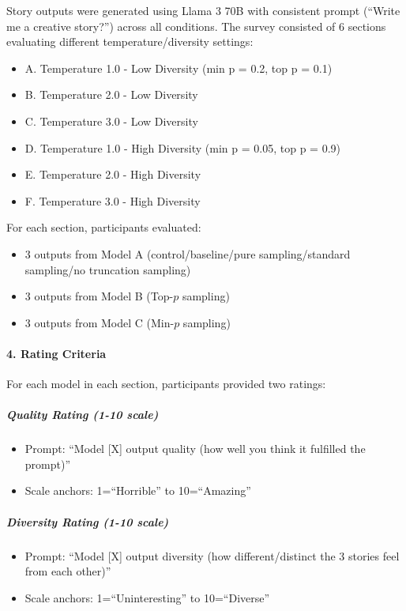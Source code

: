 \documentclass{article}
\begin{document}
Story outputs were generated using Llama 3 70B with consistent prompt (``Write me a creative story?'') across all conditions. The survey consisted of 6 sections evaluating different temperature/diversity settings:
\begin{itemize}
    \item A. Temperature 1.0 - Low Diversity (min p = 0.2, top p = 0.1)
    \item B. Temperature 2.0 - Low Diversity
    \item C. Temperature 3.0 - Low Diversity
    \item D. Temperature 1.0 - High Diversity (min p = 0.05, top p = 0.9)
    \item E. Temperature 2.0 - High Diversity
    \item F. Temperature 3.0 - High Diversity
\end{itemize}

For each section, participants evaluated:
\begin{itemize}
    \item 3 outputs from Model A (control/baseline/pure sampling/standard sampling/no truncation sampling)
    \item 3 outputs from Model B (Top-\(p\) sampling)
    \item 3 outputs from Model C (Min-\(p\) sampling)
\end{itemize}

\paragraph{4. Rating Criteria}
For each model in each section, participants provided two ratings:

\subparagraph{Quality Rating (1-10 scale)}
\begin{itemize}
    \item Prompt: ``Model [X] output quality (how well you think it fulfilled the prompt)''
    \item Scale anchors: 1=``Horrible'' to 10=``Amazing''
\end{itemize}

\subparagraph{Diversity Rating (1-10 scale)}
\begin{itemize}
    \item Prompt: ``Model [X] output diversity (how different/distinct the 3 stories feel from each other)''
    \item Scale anchors: 1=``Uninteresting'' to 10=``Diverse''
\end{itemize}
\end{document}
